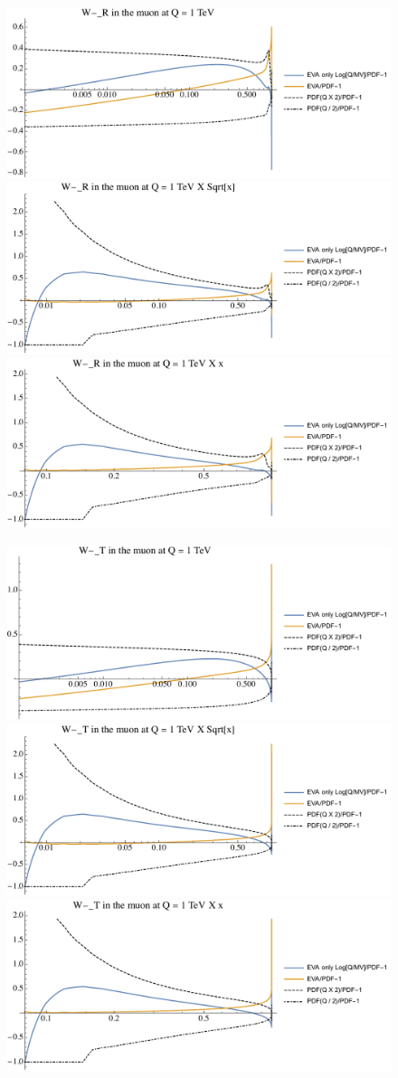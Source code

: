 \documentclass[a4paper,11pt]{article}
\begin{document}
\begin{figure}[ht]
\includegraphics[width=0.46\linewidth]{Notebooks/PlotPDFs/ratios/1TeV/W-_R_Q.pdf}
\includegraphics[width=0.46\linewidth]{Notebooks/PlotPDFs/ratios/1TeV/W-_R_Qsqrtx.pdf}
\includegraphics[width=0.46\linewidth]{Notebooks/PlotPDFs/ratios/1TeV/W-_R_Qx.pdf}
\end{figure}

\begin{figure}[ht]
\includegraphics[width=0.46\linewidth]{Notebooks/PlotPDFs/ratios/1TeV/W-_T_Q.pdf}
\includegraphics[width=0.46\linewidth]{Notebooks/PlotPDFs/ratios/1TeV/W-_T_Qsqrtx.pdf}
\includegraphics[width=0.46\linewidth]{Notebooks/PlotPDFs/ratios/1TeV/W-_T_Qx.pdf}
\end{figure}
\end{document}
